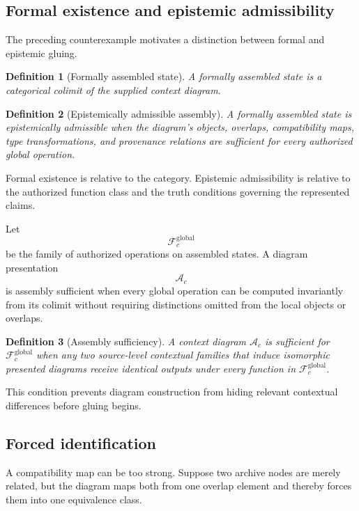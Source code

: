 \documentclass[11pt]{article}
\newtheorem{definition}{Definition}[section]
\theoremstyle{definition}
\newcommand{\F}{\mathcal{F}}
\newcommand{\A}{\mathcal{A}}
\begin{document}
\subsection{Formal existence and epistemic admissibility}

The preceding counterexample motivates a distinction between formal and epistemic gluing.

\begin{definition}[Formally assembled state]
A formally assembled state is a categorical colimit of the supplied context diagram.
\end{definition}

\begin{definition}[Epistemically admissible assembly]
A formally assembled state is epistemically admissible when the diagram's objects, overlaps, compatibility maps, type transformations, and provenance relations are sufficient for every authorized global operation.
\end{definition}

Formal existence is relative to the category. Epistemic admissibility is relative to the authorized function class and the truth conditions governing the represented claims.

Let
\[
\F_c^{\mathrm{global}}
\]
be the family of authorized operations on assembled states. A diagram presentation
\[
\A_c
\]
is assembly sufficient when every global operation can be computed invariantly from its colimit without requiring distinctions omitted from the local objects or overlaps.

\begin{definition}[Assembly sufficiency]
A context diagram \(\A_c\) is sufficient for \(\F_c^{\mathrm{global}}\) when any two source-level contextual families that induce isomorphic presented diagrams receive identical outputs under every function in \(\F_c^{\mathrm{global}}\).
\end{definition}

This condition prevents diagram construction from hiding relevant contextual differences before gluing begins.

\subsection{Forced identification}

A compatibility map can be too strong. Suppose two archive nodes are merely related, but the diagram maps both from one overlap element and thereby forces them into one equivalence class.
\end{document}
